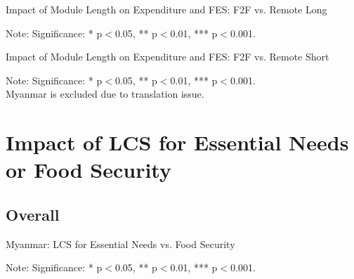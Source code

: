 \documentclass[11pt,harvard]{article}
\begin{document}
\begin{table}[htbp]
	\centering
	\begin{adjustbox}{max width=\textwidth}
		\begin{threeparttable}
			\caption{Impact of Module Length on Expenditure and FES: F2F vs. Remote Long}
			\scriptsize
			 
			\label{tab:FES_F2F_Long_All_Country}
			\begin{tablenotes}
				\item Note: Significance: * p$<$0.05, ** p$<$0.01, *** p$<$0.001. 
			\end{tablenotes}
		\end{threeparttable}
	\end{adjustbox}
\end{table}

\begin{table}[htbp]
	\centering
	\begin{adjustbox}{max width=\textwidth}
		\begin{threeparttable}
			\caption{Impact of Module Length on Expenditure and FES: F2F vs. Remote Short}
			\scriptsize
			 
			\label{tab:FES_F2F_Short_ECU_CAR}
			\begin{tablenotes}
				\item Note: Significance: * p$<$0.05, ** p$<$0.01, *** p$<$0.001. \\
				Myanmar is excluded due to translation issue.
			\end{tablenotes}
		\end{threeparttable}
	\end{adjustbox}
\end{table}

\pagebreak

\section{Impact of LCS for Essential Needs or Food Security}

\subsection{Overall}
\begin{table}[htbp]
	\centering
	\begin{adjustbox}{max width=\textwidth}
		\begin{threeparttable}
			\caption{Myanmar: LCS for Essential Needs vs. Food Security}
			\scriptsize
			 
			\label{tab:LCS_F2F_EN_FS_All_Country}
			\begin{tablenotes}
				\item Note: Significance: * p$<$0.05, ** p$<$0.01, *** p$<$0.001. 
			\end{tablenotes}
		\end{threeparttable}
	\end{adjustbox}
\end{table}
\pagebreak
\end{document}
